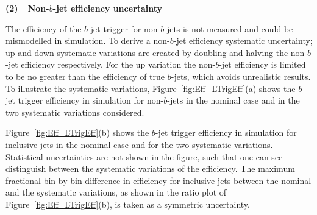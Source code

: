 \noindent
\textbf{(2)~~Non-$b$-jet efficiency uncertainty}
\label{sec:trig-lightTrigEff}

The efficiency of the $b$-jet trigger for non-$b$-jets is not measured and could be mismodelled in simulation.
To derive a non-$b$-jet efficiency systematic uncertainty; up and down systematic variations are created by doubling and halving the non-$b$-jet efficiency respectively.
For the up variation the non-$b$-jet efficiency is limited to be no greater than the efficiency of true $b$-jets, which avoids unrealistic results.
To illustrate the systematic variations,
Figure~\ref{fig:Eff_LTrigEff}(a) shows the $b$-jet trigger efficiency in simulation for non-$b$-jets in the nominal case and in the two systematic variations considered.

Figure~\ref{fig:Eff_LTrigEff}(b) shows the $b$-jet trigger efficiency in simulation for inclusive jets in the nominal case and for the two systematic variations.
Statistical uncertainties are not shown in the figure, such that one can see distinguish between the systematic variations of the efficiency.
The maximum fractional bin-by-bin difference in efficiency for inclusive jets between the nominal and the systematic variations,
as shown in the ratio plot of Figure~\ref{fig:Eff_LTrigEff}(b),
is taken as a symmetric uncertainty.

